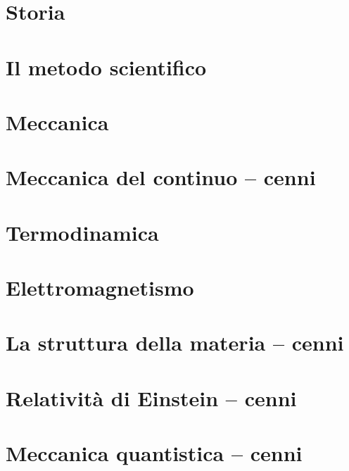 
\part{Storia}


\part{Il metodo scientifico}


\part{Meccanica}


\part{Meccanica del continuo -- cenni}


\part{Termodinamica}


\part{Elettromagnetismo}


\part{La struttura della materia -- cenni}


\part{Relatività di Einstein -- cenni}


\part{Meccanica quantistica -- cenni}

